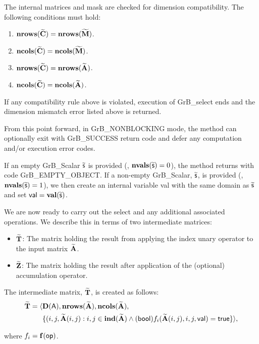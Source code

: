 The internal matrices and mask are checked for dimension compatibility. 
The following conditions must hold:
\begin{enumerate}
    \item $\bold{nrows}({\bf \widetilde{C}}) = \bold{nrows}({\bf \widetilde{M}})$.

    \item $\bold{ncols}({\bf \widetilde{C}}) = \bold{ncols}({\bf \widetilde{M}})$.

    \item $\bold{nrows}({\bf \widetilde{C}}) = \bold{nrows}({\bf \widetilde{A}})$.

    \item $\bold{ncols}({\bf \widetilde{C}}) = \bold{ncols}({\bf \widetilde{A}})$.
\end{enumerate}
If any compatibility rule above is violated, execution of {\sf GrB\_select} ends and 
the dimension mismatch error listed above is returned.

From this point forward, in {\sf GrB\_NONBLOCKING} mode, the method can optionally exit
with {\sf GrB\_SUCCESS} return code and defer any computation and/or execution error codes.

If an empty {\sf GrB\_Scalar} $\widetilde{\sf s}$ is provided (\ie, $\mathbf{nvals}(\widetilde{\sf s}) = 0$),
the method returns with code {\sf GrB\_EMPTY\_OBJECT}. If a non-empty {\sf GrB\_Scalar}, 
$\widetilde{\sf s}$, is provided (\ie, $\mathbf{nvals}(\widetilde{\sf s}) = 1$), we then create an 
internal variable {\sf val} with the same domain as $\widetilde{\sf s}$ and set 
${\sf val} = \mathbf{val}(\widetilde{\sf s})$.

We are now ready to carry out the {\sf select} and any additional 
associated operations.  We describe this in terms of two intermediate matrices:
\begin{itemize}
    \item ${\bf \widetilde{T}}$: The matrix holding the result from applying the index unary operator to the input matrix
    ${\bf \widetilde{A}}$.

    \item ${\bf \widetilde{Z}}$: The matrix holding the result after 
    application of the (optional) accumulation operator.
\end{itemize}

The intermediate matrix, ${\bf \widetilde{T}}$, is created as follows:
\[
\begin{aligned}
{\bf \widetilde{T}} = \langle & \bold{D}({\sf A}),
                           \bold{nrows}({\bf \widetilde{A}}), 
                           \bold{ncols}({\bf \widetilde{A}}), \\
						  & 
    \{(i,j,{\bf \widetilde{A}}(i,j) : {i,j} \in \bold{ind}({\bf \widetilde{A}}) 
	\wedge
({\sf bool})f_i({\bf \widetilde{A}}(i,j),i,j,{\sf val}) = {\sf true} \} \rangle, 
\end{aligned}
\]

where $f_i = \mathbf{f}({\sf op})$.




